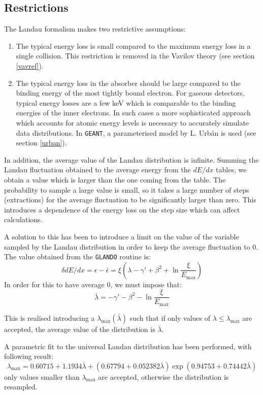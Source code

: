 \documentclass{article}
\newcommand{\Emax}{\ensuremath{E_{\mathrm{max}}}}
\newcommand{\GEANT}{\texttt{GEANT}}
\begin{document}
\subsection{Restrictions}

The Landau formalism makes two restrictive assumptions:
\begin{enumerate}
\item The typical energy loss is small compared to the maximum energy
  loss in a single collision.  This restriction is removed in the
  Vavilov theory (see section \ref{vavref}).
\item The typical energy loss in the absorber should be large compared
  to the binding energy of the most tightly bound electron.  For
  gaseous detectors, typical energy losses are a few keV which is
  comparable to the binding energies of the inner electrons.  In such
  cases a more sophisticated approach which accounts for atomic energy
  levels\cite{bib-TALM} is necessary to accurately simulate data
  distributions. In \GEANT, a parameterised model by L.  Urb\'{a}n is
  used (see section \ref{urban}).
\end{enumerate}

In addition, the average value of the Landau distribution is infinite.
Summing the Landau fluctuation obtained to the average energy from the
$dE/dx$ tables, we obtain a value which is larger than the one coming
from the table.  The probability to sample a large value is small, so
it takes a large number of steps (extractions) for the average
fluctuation to be significantly larger than zero. This introduces a
dependence of the energy loss on the step size which can affect
calculations.

A solution to this has been to introduce a limit on the value of the
variable sampled by the Landau distribution in order to keep the
average fluctuation to 0. The value obtained from the \texttt{GLANDO}
routine is:
\[
\delta dE/dx = \epsilon - \bar{\epsilon} = \xi ( \lambda - \gamma'
+\beta^2 +\ln \frac{\xi}{\Emax})
\]
In order for this to have average 0, we must impose that:
\[
\bar{\lambda} = -\gamma' - \beta^2 -\ln \frac{\xi}{\Emax}
\]

This is realised introducing a $\lambda_{\mathrm{max}}(\bar{\lambda})$
such that if only values of $\lambda \leq \lambda_{\mathrm{max}}$ are
accepted, the average value of the distribution is $\bar{\lambda}$.

A parametric fit to the universal Landau distribution has been
performed, with following result:
\[
\lambda_{\mathrm{max}} = 0.60715 +
     1.1934\bar{\lambda}+(0.67794+0.052382\bar{\lambda})
     \exp(0.94753+0.74442\bar{\lambda})
\]
only values smaller than $\lambda_{\mathrm{max}}$ are accepted, otherwise the
distribution is resampled.
\end{document}
